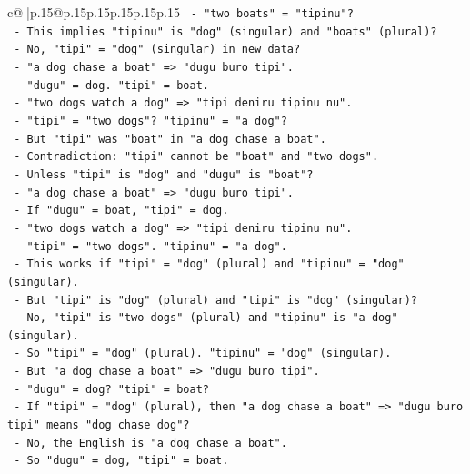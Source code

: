 \documentclass{article}
\begin{document}
{\begin{supertabular}{c@{$\;$}|p{.15\linewidth}@{}p{.15\linewidth}p{.15\linewidth}p{.15\linewidth}p{.15\linewidth}p{.15\linewidth}}
{{{\texttt{         {-} "two boats" = "tipinu"?} \\
\texttt{         {-} This implies "tipinu" is "dog" (singular) and "boats" (plural)?} \\
\texttt{         {-} No, "tipi" = "dog" (singular) in new data?} \\
\texttt{         {-} "a dog chase a boat" => "dugu buro tipi".} \\
\texttt{           {-} "dugu" = dog. "tipi" = boat.} \\
\texttt{         {-} "two dogs watch a dog" => "tipi deniru tipinu nu".} \\
\texttt{           {-} "tipi" = "two dogs"? "tipinu" = "a dog"?} \\
\texttt{           {-} But "tipi" was "boat" in "a dog chase a boat".} \\
\texttt{           {-} Contradiction: "tipi" cannot be "boat" and "two dogs".} \\
\texttt{           {-} Unless "tipi" is "dog" and "dugu" is "boat"?} \\
\texttt{           {-} "a dog chase a boat" => "dugu buro tipi".} \\
\texttt{             {-} If "dugu" = boat, "tipi" = dog.} \\
\texttt{             {-} "two dogs watch a dog" => "tipi deniru tipinu nu".} \\
\texttt{               {-} "tipi" = "two dogs". "tipinu" = "a dog".} \\
\texttt{               {-} This works if "tipi" = "dog" (plural) and "tipinu" = "dog" (singular).} \\
\texttt{               {-} But "tipi" is "dog" (plural) and "tipi" is "dog" (singular)?} \\
\texttt{               {-} No, "tipi" is "two dogs" (plural) and "tipinu" is "a dog" (singular).} \\
\texttt{               {-} So "tipi" = "dog" (plural). "tipinu" = "dog" (singular).} \\
\texttt{               {-} But "a dog chase a boat" => "dugu buro tipi".} \\
\texttt{                 {-} "dugu" = dog? "tipi" = boat?} \\
\texttt{                 {-} If "tipi" = "dog" (plural), then "a dog chase a boat" => "dugu buro tipi" means "dog chase dog"?} \\
\texttt{                 {-} No, the English is "a dog chase a boat".} \\
\texttt{                 {-} So "dugu" = dog, "tipi" = boat.} \\
}}}
\end{supertabular}}
\end{document}
